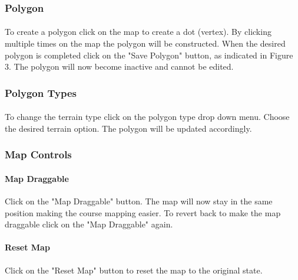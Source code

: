 \documentclass{article}
\begin{document}
    
    \subsubsection{Polygon}
    
    \paragraph{}
    To create a polygon click on the map to create a dot (vertex). By clicking multiple times on the map the polygon will be constructed. When the desired polygon is completed click on the "Save Polygon" button, as indicated in Figure 3. The polygon will now become inactive and cannot be edited.
    
    \subsubsection{Polygon Types}

    \paragraph{}
    To change the terrain type click on the polygon type drop down menu. Choose the desired terrain option. The polygon will be updated accordingly.
    
    \subsubsection{Map Controls}
    
    \paragraph{Map Draggable}
    Click on the "Map Draggable" button. The map will now stay in the same position making the course mapping easier. To revert back to make the map draggable click on the "Map Draggable" again.
    \paragraph{Reset Map}
    Click on the "Reset Map" button to reset the map to the original state.
\end{document}
